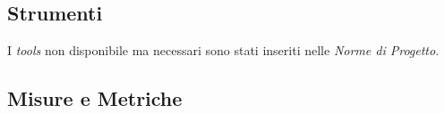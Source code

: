 	\subsection{Strumenti}
		I \emph{tools} non disponibile ma necessari sono stati inseriti nelle \emph{Norme di Progetto}. %
	
\iffalse %
	\subsection{Tecniche}
		\subsubsection{Analisi statica}
			\paragraph{Walkthrough}
			\paragraph{Inspection}
		\subsubsection{Analisi dinamica}
			\paragraph{Test di unità}
			\paragraph{Test di integrazione}
			\paragraph{Test di sistema}
			\paragraph{Test di regressione}
			\paragraph{Test di accettazione}
\fi
	
\iffalse %

	\subsection{Misure e Metriche}
